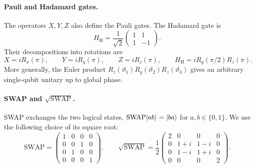 \paragraph{Pauli and Hadamard gates.}
The operators $X,Y,Z$ also define the Pauli gates. The Hadamard gate is
\begin{equation}
 H_{\mathrm H}=\frac{1}{\sqrt2}
                  \begin{pmatrix}1&1\\1&-1\end{pmatrix}.
 \label{eq:hadamard-gate-matrix}
\end{equation}
Their decompositions into rotations are
\begin{equation}
 X=iR_x(\pi),\qquad Y=iR_y(\pi),\qquad Z=iR_z(\pi),\qquad
 H_{\mathrm H}=iR_y(\pi/2)R_z(\pi).
 \label{eq:elementary-single-qubit-gates}
\end{equation}
More generally, the Euler product
$R_z(\vartheta_1)R_y(\vartheta_2)R_z(\vartheta_3)$ gives an
arbitrary single-qubit unitary up to global phase.

\paragraph{SWAP and \texorpdfstring{$\sqrt{\mathrm{SWAP}}$}{square-root SWAP}.}
SWAP exchanges the two logical states,
$\mathrm{SWAP}\lvert ab\rangle=\lvert ba\rangle$ for $a,b\in\{0,1\}$.
We use the following choice of its square root:
\begin{equation}
 \mathrm{SWAP}=\begin{pmatrix}
  1&0&0&0\\0&0&1&0\\0&1&0&0\\0&0&0&1
 \end{pmatrix},\qquad
 \sqrt{\mathrm{SWAP}}=\frac12\begin{pmatrix}
  2&0&0&0\\0&1+i&1-i&0\\0&1-i&1+i&0\\0&0&0&2
 \end{pmatrix}.
 \label{eq:exchange-gate-matrices}
\end{equation}

